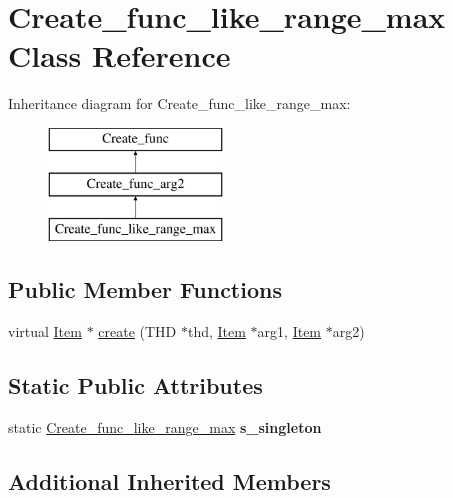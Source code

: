 \hypertarget{classCreate__func__like__range__max}{}\section{Create\+\_\+func\+\_\+like\+\_\+range\+\_\+max Class Reference}
\label{classCreate__func__like__range__max}
Inheritance diagram for Create\+\_\+func\+\_\+like\+\_\+range\+\_\+max\+:\begin{figure}[H]
\begin{center}
\leavevmode
\includegraphics[height=3.000000cm]{classCreate__func__like__range__max}
\end{center}
\end{figure}
\subsection*{Public Member Functions}
\begin{DoxyCompactItemize}
\item 
virtual \mbox{\hyperlink{classItem}{Item}} $\ast$ \mbox{\hyperlink{classCreate__func__like__range__max_a6c9f6fbe72cf44003a441f587131ab30}{create}} (T\+HD $\ast$thd, \mbox{\hyperlink{classItem}{Item}} $\ast$arg1, \mbox{\hyperlink{classItem}{Item}} $\ast$arg2)
\end{DoxyCompactItemize}
\subsection*{Static Public Attributes}
\begin{DoxyCompactItemize}
\item 
\mbox{\label{classCreate__func__like__range__max_aea86649ed9e667d0dd10a2257018e82d}} 
static \mbox{\hyperlink{classCreate__func__like__range__max}{Create\+\_\+func\+\_\+like\+\_\+range\+\_\+max}} {\bfseries s\+\_\+singleton}
\end{DoxyCompactItemize}
\subsection*{Additional Inherited Members}


